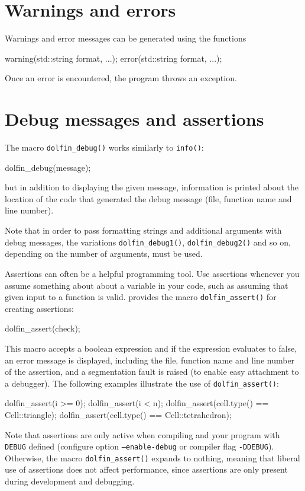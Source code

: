 \section{Warnings and errors}

Warnings and error messages can be generated using the functions
\begin{code}
warning(std::string format, ...);
error(std::string format, ...);
\end{code}
Once an error is encountered, the program throws an exception.

\section{Debug messages and assertions}

The macro \texttt{dolfin\_debug()} works similarly to
\texttt{info()}:
\begin{code}
dolfin_debug(message);
\end{code}
but in addition to displaying the given message, information is printed about
the location of the code that generated the debug message (file,
function name and line number).

Note that in order to pass formatting strings and additional arguments
with debug messages, the variations \texttt{dolfin\_debug1()},
\texttt{dolfin\_debug2()} and so on, depending on the number of
arguments, must be used.

Assertions can often be a helpful programming tool. Use assertions
whenever you assume something about about a variable in your code,
such as assuming that given input to a function is valid. \dolfin{}
provides the macro \texttt{dolfin\_assert()} for creating assertions:
\begin{code}
dolfin_assert(check);
\end{code}
This macro accepts a boolean expression and if the expression
evaluates to false, an error message is displayed, including the
file, function name and line number of the assertion, and a
segmentation fault is raised (to enable easy attachment to a
debugger). The following examples illustrate the use of
\texttt{dolfin\_assert()}:
\begin{code}
dolfin_assert(i >= 0);
dolfin_assert(i < n);
dolfin_assert(cell.type() == Cell::triangle);
dolfin_assert(cell.type() == Cell::tetrahedron);
\end{code}
Note that assertions are only active when compiling
\dolfin{} and your program with \texttt{DEBUG} defined (configure
option \texttt{--enable-debug} or compiler flag \texttt{-DDEBUG}).
Otherwise, the macro \texttt{dolfin\_assert()} expands to nothing,
meaning that liberal use of assertions does not affect performance,
since assertions are only present during development and
debugging.

